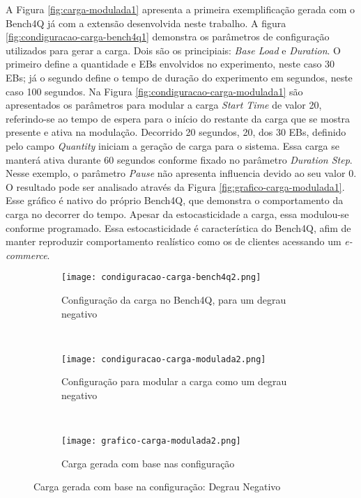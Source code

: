A Figura \ref{fig:carga-modulada1} apresenta a primeira exemplificação gerada com o Bench4Q já com a extensão desenvolvida neste trabalho. A figura \ref{fig:condiguracao-carga-bench4q1} demonstra os parâmetros de configuração utilizados para gerar a carga. Dois são os principiais: \textit{Base Load} e \textit{Duration}. O primeiro define a quantidade e EBs envolvidos no experimento, neste caso 30 EBs; já o segundo define o tempo de duração do experimento em segundos, neste caso 100 segundos. Na Figura \ref{fig:condiguracao-carga-modulada1} são apresentados os parâmetros para modular a carga \textit{Start Time} de valor 20, referindo-se ao tempo de espera para o início do restante da carga que se mostra presente e ativa na modulação. Decorrido 20 segundos, 20, dos 30 EBs, definido pelo campo \textit{Quantity} iniciam a geração de carga para o sistema. Essa carga se manterá ativa durante 60 segundos conforme fixado no parâmetro \textit{Duration Step}. Nesse exemplo, o parâmetro \textit{Pause} não apresenta influencia devido ao seu valor 0.
O resultado pode ser analisado através da Figura \ref{fig:grafico-carga-modulada1}. Esse gráfico é nativo do próprio Bench4Q, que demonstra o comportamento da carga no decorrer do tempo. Apesar da estocasticidade a carga, essa modulou-se conforme programado. Essa estocasticidade é característica do Bench4Q, afim de manter reproduzir comportamento realístico como os de clientes acessando um \textit{e-commerce}.

\begin{figure}[!htb]
	\begin{subfigure}{\linewidth}
		\centering
		\texttt{[image: condiguracao-carga-bench4q2.png]}
		\caption{Configuração da carga no Bench4Q, para um degrau negativo}
		\label{fig:condiguracao-carga-bench4q2}
	\end{subfigure}\\
	\begin{subfigure}{\linewidth}
		\centering
		\texttt{[image: condiguracao-carga-modulada2.png]}
		\caption{Configuração para modular a carga como um degrau negativo}
		\label{fig:condiguracao-carga-modulada2}
	\end{subfigure}\\[1ex]
	\begin{subfigure}{\linewidth}
		\centering
		\texttt{[image: grafico-carga-modulada2.png]}
		\caption{Carga gerada com base nas configuração}
		\label{fig:grafico-carga-modulada2}
	\end{subfigure}
	\caption{Carga gerada com base na configuração: Degrau Negativo}
	\label{fig:carga-modulada2}
	\fautor
\end{figure}

